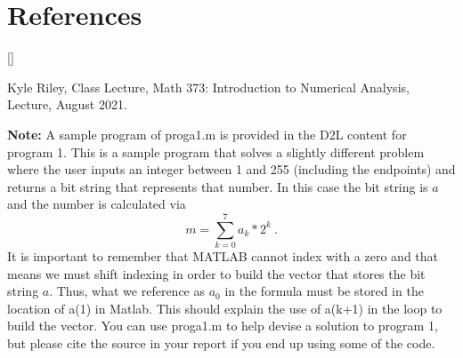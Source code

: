 \documentclass{article}
\def\beginrefs{\begin{list}%
        {[\arabic{equation}]}{\usecounter{equation}
         \setlength{\leftmargin}{2.0truecm}\setlength{\labelsep}{0.4truecm}%
         \setlength{\labelwidth}{1.6truecm}}}
\def\endrefs{\end{list}}
\def\bibentry#1{\item[\hbox{[#1]}]}
\def\ds{\displaystyle}
\begin{document}
\par \bigskip \par

\section*{References}
\beginrefs

\bibentry{KR21} {\sc Kyle Riley}, Class Lecture, Math 373: Introduction to Numerical Analysis, Lecture, August 2021. 
\endrefs
\par \bigskip \noindent
{\bf Note:} A sample program of proga1.m is provided in the D2L content for program 1. This is a sample program that solves a slightly different problem where the user inputs an integer between 1 and 255 (including the endpoints) and returns a bit string that represents that number. In this case the bit string is $a$ and the number is calculated via 
$$m = \sum_{k=0}^7 a_k*2^k\ .$$
It is important to remember that MATLAB cannot index with a zero and that means we must shift indexing in order to build the vector that stores the bit string $a$. Thus, what we reference as $\ds a_0$ in the formula must be stored in the location of a(1) in Matlab. This should explain the use of a(k+1) in the loop to build the vector. You can use proga1.m to help devise a solution to program 1, but please cite the source in your report if you end up using some of the code. 
\end{document}
